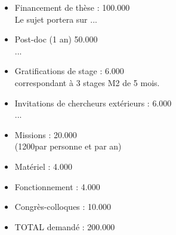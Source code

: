 \documentclass[14pt,fleqn]{article}
\begin{document}
\vspace{.5in}
 
\begin{itemize}

\item Financement de thèse : \hfill 100.000 \EUR\\
{\footnotesize Le sujet portera sur ...}
\item Post-doc (1 an) \hfill 50.000 \EUR\\
{\footnotesize ...}
\item Gratifications de stage : \hfill 6.000 \EUR\\
{\footnotesize correspondant à 3 stages M2 de 5 mois.}
\item Invitations de chercheurs extérieurs : \hfill 6.000 \EUR\\
{\footnotesize ...
}
\item Missions : \hfill 20.000 \EUR\\
{\footnotesize (1200\EUR par personne et par an)}
\item Matériel : \hfill 4.000 \EUR
\item Fonctionnement : \hfill 4.000 \EUR
\item Congrès-colloques :  \hfill 10.000 \EUR
\item TOTAL demandé : \hfill 200.000 \EUR
\end{itemize}


  

  
\end{document}
